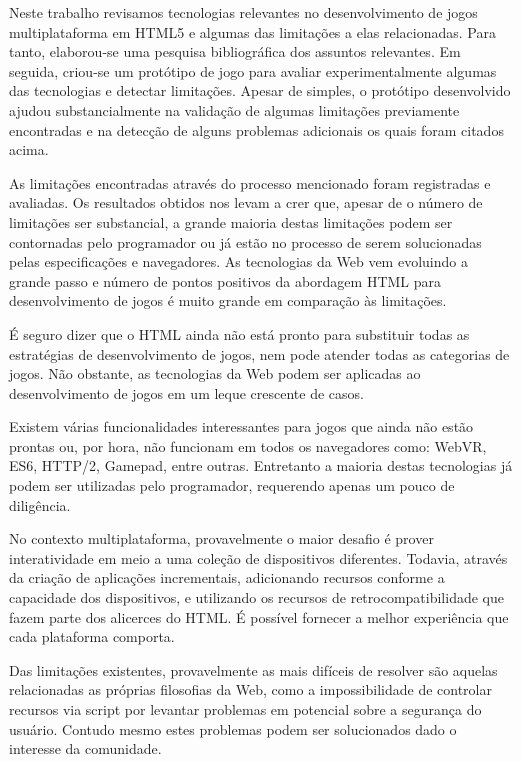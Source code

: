 Neste trabalho revisamos tecnologias relevantes no desenvolvimento
de jogos multiplataforma em HTML5 e algumas das limitações a elas
relacionadas. Para tanto, elaborou-se uma pesquisa bibliográfica
dos assuntos relevantes. Em seguida, criou-se um protótipo de jogo
para avaliar experimentalmente algumas das tecnologias e detectar
limitações. Apesar de simples, o protótipo desenvolvido ajudou
substancialmente na validação de algumas limitações previamente
encontradas e na detecção de alguns problemas adicionais os quais
foram citados acima.

As limitações encontradas através do processo mencionado foram
registradas e avaliadas. Os resultados obtidos nos levam a crer que,
apesar de o número de limitações ser substancial, a grande maioria
destas limitações podem ser contornadas pelo programador ou já estão
no processo de serem solucionadas pelas especificações e navegadores.
As tecnologias da Web vem evoluindo a grande passo e número de pontos
positivos da abordagem HTML para desenvolvimento de jogos é muito
grande em comparação às limitações.

É seguro dizer que o HTML ainda não está pronto para substituir todas
as estratégias de desenvolvimento de jogos, nem pode atender todas as
categorias de jogos. Não obstante, as tecnologias da Web podem ser
aplicadas ao desenvolvimento de jogos em um leque crescente de casos.

Existem várias funcionalidades interessantes para jogos que ainda não
estão prontas ou, por hora, não funcionam em todos os navegadores
como: WebVR, ES6, HTTP/2, Gamepad, entre outras. Entretanto a maioria
destas tecnologias já podem ser utilizadas pelo programador, requerendo
apenas um pouco de diligência.

No contexto multiplataforma, provavelmente o maior desafio é prover
interatividade em meio a uma coleção de dispositivos diferentes.
Todavia, através da criação de aplicações incrementais,
adicionando recursos conforme a capacidade dos dispositivos, e
utilizando os recursos de retrocompatibilidade que fazem parte dos
alicerces do HTML. É possível fornecer a melhor experiência que cada
plataforma comporta.

Das limitações existentes, provavelmente as mais difíceis de resolver
são aquelas relacionadas as próprias filosofias da Web, como a
impossibilidade de controlar recursos via script por levantar problemas
em potencial sobre a segurança do usuário. Contudo mesmo estes problemas
podem ser solucionados dado o interesse da comunidade.


